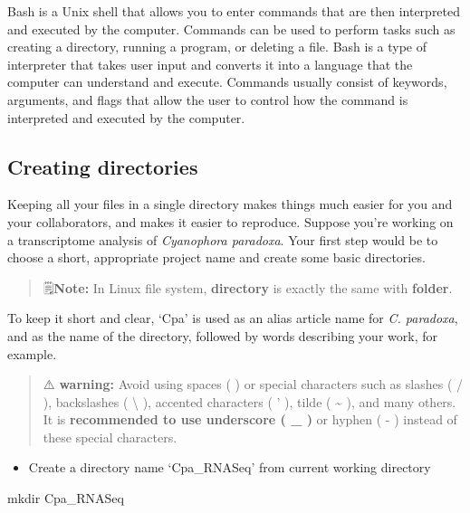 \documentclass[
  letterpaper,
  DIV=11,
  numbers=noendperiod]{scrreprt}
\newenvironment{Shaded}{\begin{snugshade}}{\end{snugshade}}
\newcommand{\FunctionTok}[1]{\textcolor[rgb]{0.28,0.35,0.67}{#1}}
\newcommand{\NormalTok}[1]{\textcolor[rgb]{0.00,0.23,0.31}{#1}}
\providecommand{\tightlist}{%
  \setlength{\itemsep}{0pt}\setlength{\parskip}{0pt}}\usepackage{longtable,booktabs,array}
\begin{document}
Bash is a Unix shell that allows you to enter commands that are then
interpreted and executed by the computer. Commands can be used to
perform tasks such as creating a directory, running a program, or
deleting a file. Bash is a type of interpreter that takes user input and
converts it into a language that the computer can understand and
execute. Commands usually consist of keywords, arguments, and flags that
allow the user to control how the command is interpreted and executed by
the computer.

\hypertarget{creating-directories}{%
\subsection*{Creating directories}\label{creating-directories}}

Keeping all your files in a single directory makes things much easier
for you and your collaborators, and makes it easier to reproduce.
Suppose you're working on a transcriptome analysis of \emph{Cyanophora
paradoxa}. Your first step would be to choose a short, appropriate
project name and create some basic directories.

\begin{quote}
🗒️\textbf{Note:} In Linux file system, \textbf{directory} is exactly the
same with \textbf{folder}.
\end{quote}

To keep it short and clear, `Cpa' is used as an alias article name for
\emph{C. paradoxa}, and as the name of the directory, followed by words
describing your work, for example.

\begin{quote}
⚠️ \textbf{warning:} Avoid using spaces ( ) or special characters such
as slashes ( / ), backslashes ( \textbackslash{} ), accented characters
( ' ), tilde ( \textasciitilde{} ), and many others. It is
\textbf{recommended to use underscore ( \_ )} or hyphen ( - ) instead of
these special characters.
\end{quote}

\begin{itemize}
\tightlist
\item
  Create a directory name `Cpa\_RNASeq' from current working directory
\end{itemize}

\begin{Shaded}
\begin{Highlighting}[]
\FunctionTok{mkdir}\NormalTok{ Cpa\_RNASeq}
\end{Highlighting}
\end{Shaded}
\end{document}
